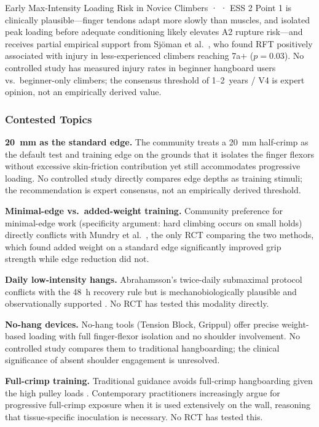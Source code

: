 \begin{bioplausbox}{Early Max-Intensity Loading Risk in Novice Climbers · \bioplausible · ESS 2}
Point 1 is clinically plausible---finger tendons adapt more slowly than muscles, and isolated peak loading before adequate conditioning likely elevates A2 rupture risk---and receives partial empirical support from Sjöman et al.\ \cite{SGJ23}, who found RFT positively associated with injury in less-experienced climbers reaching 7a$+$ ($p=0.03$). No controlled study has measured injury rates in beginner hangboard users vs.\ beginner-only climbers; the consensus threshold of 1--2~years / V4 is expert opinion, not an empirically derived value.
\end{bioplausbox}

\subsubsection*{Contested Topics}

\textbf{20~mm as the standard edge.} The community treats a 20~mm half-crimp as the default test and training edge on the grounds that it isolates the finger flexors without excessive skin-friction contribution yet still accommodates progressive loading. No controlled study directly compares edge depths as training stimuli; the recommendation is expert consensus, not an empirically derived threshold.

\textbf{Minimal-edge vs.\ added-weight training.} Community preference for minimal-edge work (specificity argument: hard climbing occurs on small holds) directly conflicts with Mundry et al.\ \cite{MSA+21}, the only RCT comparing the two methods, which found added weight on a standard edge significantly improved grip strength while edge reduction did not.

\textbf{Daily low-intensity hangs.} Abrahamsson's twice-daily submaximal protocol conflicts with the 48~h recovery rule but is mechanobiologically plausible and observationally supported \cite{GKAO24}. No RCT has tested this modality directly.

\textbf{No-hang devices.} No-hang tools (Tension Block, Grippul) offer precise weight-based loading with full finger-flexor isolation and no shoulder involvement. No controlled study compares them to traditional hangboarding; the clinical significance of absent shoulder engagement is unresolved.

\textbf{Full-crimp training.} Traditional guidance avoids full-crimp hangboarding given the high pulley loads \cite{Sch01}. Contemporary practitioners increasingly argue for progressive full-crimp exposure when it is used extensively on the wall, reasoning that tissue-specific inoculation is necessary. No RCT has tested this.

